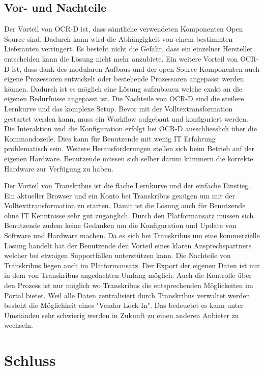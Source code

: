 \documentclass[a4paper,oneside, 12pt]{report}
\begin{document}
\section{Vor- und Nachteile}
Der Vorteil von OCR-D ist, dass sämtliche verwendeten Komponenten Open Source sind. Dadurch kann wird die Abhängigkeit von einem bestimmten Lieferanten verringert. Es besteht nicht die Gefahr, dass ein einzelner Hersteller entscheiden kann die Lösung nicht mehr anzubiete. Ein weitere Vorteil von OCR-D ist, dass dank des modularen Aufbaus und der open Source Komponenten auch eigene Prozessoren entwickelt oder bestehende Prozessoren angepasst werden können. Dadurch ist es möglich eine Lösung aufzubauen welche exakt an die eigenen Bedürfnisse angepasst ist.
Die Nachteile von OCR-D sind die steilere Lernkurve und das komplexe Setup. Bevor mit der Volltextransformation gestartet werden kann, muss ein Workflow aufgebaut und konfiguriert werden. Die Interaktion und die Konfiguration erfolgt bei OCR-D ausschliesslich über die Kommandozeile. Dies kann für Benutzende mit wenig IT Erfahrung problematisch sein. Weitere Herausforderungen stellen sich beim Betrieb auf der eigenen Hardware. Benutzende müssen sich selber darum kümmern die korrekte Hardware zur Verfügung zu haben.

Der Vorteil von Transkribus ist die flache Lernkurve und der einfache Einstieg. Ein aktueller Browser und ein Konto bei Transkribus genügen um mit der Volltexttransformation zu starten. Damit ist die Lösung auch für Benutzende ohne IT Kenntnisse sehr gut zugänglich. Durch den Platformansatz müssen sich Benutzende zudem keine Gedanken um die Konfiguration und Update von Software und Hardware machen. Da es sich bei Transkribus um eine kommerzielle Lösung handelt hat der Benutzende den Vorteil eines klaren Ansprechspartners welcher bei etwaigen Supportfällen unterstützen kann.
Die Nachteile von Transkribus liegen auch im Platformansatz. Der Export der eigenen Daten ist nur in dem von Transkribus angedachten Umfang möglich. Auch die Kontrolle über den Prozess ist nur möglich wo Transkribus die entsprechenden Möglickeiten im Portal bietet. Weil alle Daten zentralisiert durch Transkribus verwaltet werden besteht die Möglichkeit eines "Vendor Lock-In". Das bedeuetet es kann unter Umständen sehr schwierig werden in Zukunft zu einen anderen Anbieter zu wechseln.

\chapter{Schluss}\label{sec:schluss}
\end{document}
